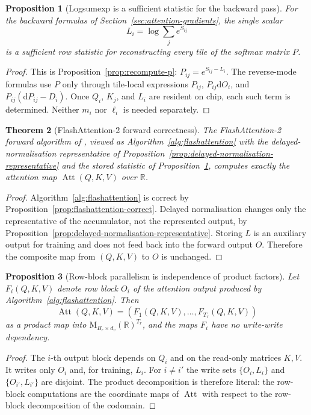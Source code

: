 \documentclass[11pt]{amsart}
\theoremstyle{plain}
\newtheorem{theorem}{Theorem}[section]
\newtheorem{proposition}[theorem]{Proposition}
\theoremstyle{definition}
\newcommand{\R}{\mathbb{R}}
\newcommand{\Mat}[2]{\mathrm{M}_{#1 \times #2}(\R)}
\newcommand{\Att}{\operatorname{Att}}
\begin{document}
\begin{proposition}[Logsumexp is a sufficient statistic for the backward pass]
\label{prop:lse-sufficient-first-principles}
For the backward formulas of Section~\ref{sec:attention-gradients}, the single
scalar
\[
    L_i=\log\sum_j e^{S_{ij}}
\]
is a sufficient row statistic for reconstructing every tile of the softmax
matrix $P$.
\end{proposition}
\begin{proof}
This is Proposition~\ref{prop:recompute-p}: $P_{ij}=e^{S_{ij}-L_i}$.
The reverse-mode formulas use $P$ only through tile-local expressions
$P_{ij}$, $P_{ij}\mathrm{d}O_i$, and
$P_{ij}(\mathrm{d}P_{ij}-D_i)$.  Once $Q_i$, $K_j$, and $L_i$ are resident
on chip, each such term is determined.  Neither $m_i$ nor $\ell_i$ is needed
separately.
\end{proof}

\begin{theorem}[FlashAttention-2 forward correctness]
\label{thm:flash2-forward-correct-first-principles}
The FlashAttention-2 forward algorithm of \cite{Dao2023}, viewed as
Algorithm~\ref{alg:flashattention} with the delayed-normalisation
representative of Proposition~\ref{prop:delayed-normalisation-representative}
and the stored statistic of Proposition~\ref{prop:lse-sufficient-first-principles},
computes exactly the attention map $\Att(Q,K,V)$ over $\R$.
\end{theorem}
\begin{proof}
Algorithm~\ref{alg:flashattention} is correct by
Proposition~\ref{prop:flashattention-correct}.  Delayed normalisation changes
only the representative of the accumulator, not the represented output, by
Proposition~\ref{prop:delayed-normalisation-representative}.  Storing $L$ is
an auxiliary output for training and does not feed back into the forward output
$O$.  Therefore the composite map from $(Q,K,V)$ to $O$ is unchanged.
\end{proof}

\begin{proposition}[Row-block parallelism is independence of product factors]
\label{prop:row-block-independence}
Let $F_i(Q,K,V)$ denote row block $O_i$ of the attention output produced by
Algorithm~\ref{alg:flashattention}.  Then
\[
    \Att(Q,K,V) = (F_1(Q,K,V),\ldots,F_{T_r}(Q,K,V))
\]
as a product map into
$\Mat{B_r}{d_v}^{T_r}$, and the maps $F_i$ have no write-write dependency.
\end{proposition}
\begin{proof}
The $i$-th output block depends on $Q_i$ and on the read-only matrices
$K,V$.  It writes only $O_i$ and, for training, $L_i$.  For $i\neq i'$ the
write sets $\{O_i,L_i\}$ and $\{O_{i'},L_{i'}\}$ are disjoint.  The product
decomposition is therefore literal: the row-block computations are the
coordinate maps of $\Att$ with respect to the row-block decomposition of the
codomain.
\end{proof}
\end{document}
